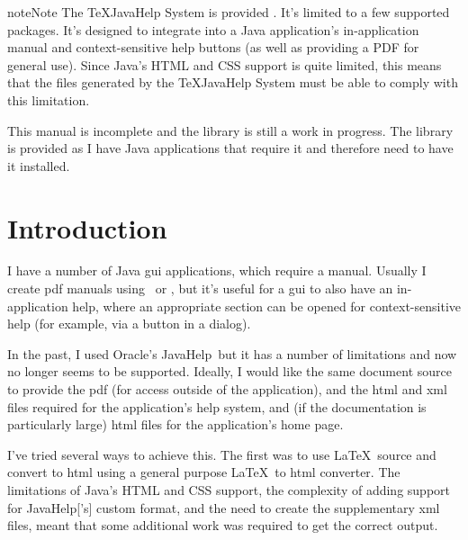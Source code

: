 \documentclass[toc=listof]{scrreport}
\title{\TeXJavaHelp}
\author[Nicola L.C. Talbot]{Nicola L.C. Talbot\\\href{https://www.dickimaw-books.com/}{\nolinkurl{dickimaw-books.com}}}
\begin{document}
\maketitle

\begin{prefrontmatterblock}{note}{Note}
The \gls{TeXJavaHelp} System is provided . It's limited to a
few supported packages. It's designed to integrate into a Java
application's in-application manual and context-sensitive help
buttons (as well as providing a PDF for general use). 
Since Java's HTML and CSS support is quite limited, this
means that the files generated by the \gls{TeXJavaHelp} System must be
able to comply with this limitation.

\begin{warning}
This manual is incomplete and the library is still a work in
progress. The library is provided as I have Java applications that
require it and therefore need to have it installed.
\end{warning}

\end{prefrontmatterblock}

\frontmatter
\tableofcontents
\listoffigures

\mainmatter
\chapter{Introduction}
\label{sec:intro}

I have a number of Java \gls{gui} applications, which require a manual.
Usually I create \gls{pdf} manuals using \pdfLaTeX\ or \LuaLaTeX, but
it's useful for a \gls{gui} to also have an in-application help, where 
an appropriate section can be opened for context-sensitive help (for example,
via a  button in a dialog).

In the past, I used Oracle's \gls{JavaHelp}\texttrademark\ but it has a number of
limitations and now no longer seems to be supported. Ideally, I
would like the same document source to provide the \gls{pdf} (for
access outside of the application), and the \gls{html} and \gls{xml}
files required for the application's help system, and (if the
documentation is particularly large) \gls{html} files for the
application's home page.

I've tried several ways to achieve this. The first was to use \LaTeX\ source
and convert to \gls{html} using a general purpose \LaTeX\ to
\gls{html} converter. The limitations of Java's HTML and CSS
support, the complexity of adding support for \gls{JavaHelp}['s] custom
 format, and the need to create the supplementary \gls{xml}
files, meant that some additional work was required to get the correct output.
\end{document}
